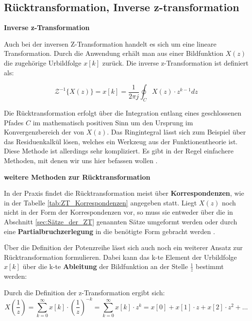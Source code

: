 \addvspace{1cm}
\subsection{Rücktransformation, Inverse z-transformation}

\textbf{Inverse z-Transformation}

Auch bei der inversen Z-Transformation handelt es sich um eine lineare Transformation. Durch die Anwendung erhält man aus einer Bildfunktion $X(z)$ die zugehörige Urbildfolge $x[k]$ zurück. Die inverse z-Transformation ist definiert als:

\begin{equation}
    \label{eq:inverse_z_transformation}
    \mathcal{Z}^{-1}\{X(z)\} = x[k] = \frac{1}{2\pi j} \oint_{C} X(z) \cdot z^{k-1} dz
\end{equation}

Die Rücktransformation erfolgt über die Integration entlang eines geschlossenen Pfades $C$ im mathematisch positiven Sinn um den Ursprung im Konvergenzbereich der von $X(z)$. Das Ringintegral lässt sich zum Beispiel über das Residuenkalkül lösen, welches ein Werkzeug aus der Funktionentheorie ist. Diese Methode ist allerdings sehr kompliziert. Es gibt in der Regel einfachere Methoden, mit denen wir uns hier befassen wollen \cite[S.246]{book2}.
\addvspace{1cm}

\textbf{weitere Methoden zur Rücktransformation}

In der Praxis findet die Rücktransformation meist über \textbf{Korrespondenzen}, wie in der Tabelle \ref{tab:ZT_Korrespondenzen} angegeben statt.
Liegt $X(z)$ noch nicht in der Form der Korrespondenzen vor, so muss sie entweder über die in Abschnitt \ref{sec:Sätze_der_ZT} genannten Sätze umgeformt werden oder durch eine \textbf{Partialbruchzerlegung} in die benötigte Form gebracht werden \cite[S.246]{book2}.

Über die Definition der Potenzreihe lässt sich auch noch ein weiterer Ansatz zur Rücktransformation formulieren. Dabei kann das k-te Element der Urbildfolge $x[k]$ über die k-te \textbf{Ableitung} der Bildfunktion an der Stelle $\frac{1}{z}$ bestimmt werden:

Durch die Definition der z-Transformation ergibt sich:
\begin{equation}
    X(\frac{1}{z}) = \sum_{k=0}^{\infty} x[k] \cdot \left(\frac{1}{z}\right)^{-k} = \sum_{k=0}^{\infty} x[k] \cdot z^{k} = x[0] + x[1] \cdot z + x[2] \cdot z^2 + \ldots
\end{equation}

